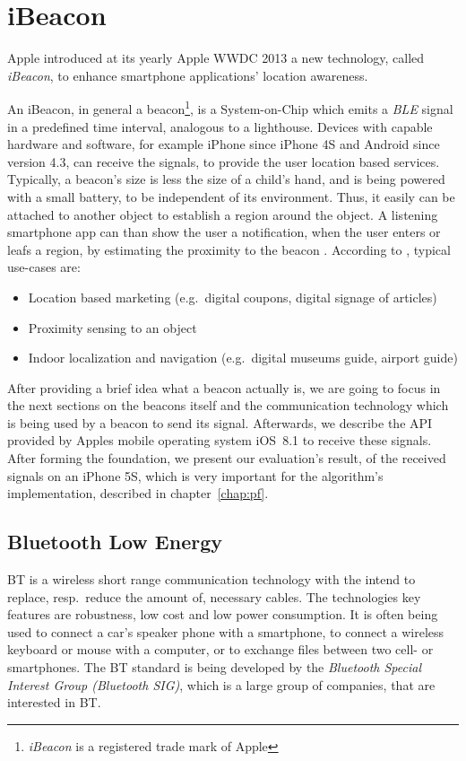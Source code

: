 \chapter{iBeacon} \label{chap:ibeacons}
Apple introduced at its yearly Apple \ac{WWDC} 2013 a new technology, called \textit{iBeacon}, to enhance smartphone applications' location awareness.

An iBeacon, in general a beacon\footnote{\textit{iBeacon} is a registered trade mark of Apple}, is a System-on-Chip which emits a \textit{\acl{BLE}} signal in a predefined time interval, analogous to a lighthouse. Devices with capable hardware and software, for example iPhone since iPhone 4S and Android since version 4.3, can receive the signals, to provide the user location based services. Typically, a beacon's size is less the size of a child's hand, and is being powered with a small battery, to be independent of its environment. Thus, it easily can be attached to another object to establish a region around the object. A listening smartphone app can than show the user a notification, when the user enters or leafs a region, by estimating the proximity to the beacon \citep{apple:getting_started,binside:ds}. According to \citet{binside:ds}, typical use-cases are:
\begin{itemize}
  \item Location based marketing (e.g.\ digital coupons, digital signage of articles)
  \item Proximity sensing to an object
  \item Indoor localization and navigation (e.g.\ digital museums guide, airport guide)
\end{itemize}

After providing a brief idea what a beacon actually is, we are going to focus in the next sections on the beacons itself and the communication technology which is being used by a beacon to send its signal. Afterwards, we describe the \acs{API} provided by Apples mobile operating system iOS~8.1 to receive these signals. After forming the foundation, we present our evaluation's result, of the received signals on an iPhone 5S, which is very important for the algorithm's implementation, described in chapter~\ref{chap:pf}.


\section{Bluetooth Low Energy}\label{sec:ble}
\ac{BT} is a wireless short range communication technology with the intend to replace, resp.\ reduce the amount of, necessary cables. The technologies key features are robustness, low cost and low power consumption. It is often being used to connect a car's speaker phone with a smartphone, to connect a wireless keyboard or mouse with a computer, or to exchange files between two cell- or smartphones. The \acl{BT} standard is being developed by the \emph{Bluetooth Special Interest Group (Bluetooth SIG)}, which is a large group of companies, that are interested in \acs{BT}.

